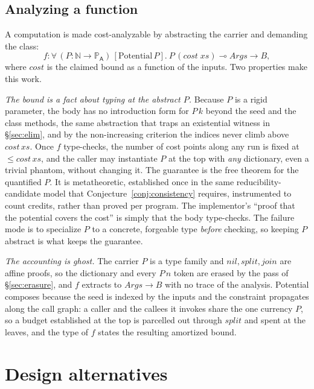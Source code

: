 \documentclass[11pt]{article}
\newcommand{\Prop}[1]{\mathbb{P}_{#1}}            %
\theoremstyle{definition}
\theoremstyle{plain}
\begin{document}
\subsection{Analyzing a function}

A computation is made cost-analyzable by abstracting the carrier and demanding the
class:
\[
  f : \forall\,(P:\mathbb{N}\to\Prop{\mathsf{A}})\,[\mathrm{Potential}\,P].\
  P\,(\mathit{cost}\;\mathit{xs}) \multimap \mathit{Args} \to B,
\]
where $\mathit{cost}$ is the claimed bound as a function of the inputs. Two
properties make this work.

\emph{The bound is a fact about typing at the abstract $P$.} Because $P$ is a rigid
parameter, the body has no introduction form for $P\,k$ beyond the seed and the
class methods, the same abstraction that traps an existential witness in
\S\ref{sec:elim}, and by the non-increasing criterion the indices never climb above
$\mathit{cost}\,\mathit{xs}$. Once $f$ type-checks, the number of cost points along
any run is fixed at $\le \mathit{cost}\,\mathit{xs}$, and the caller may instantiate
$P$ at the top with \emph{any} dictionary, even a trivial phantom, without changing
it. The guarantee is the free theorem for the quantified $P$. It is metatheoretic,
established once in the same reducibility-candidate model that
Conjecture~\ref{conj:consistency} requires, instrumented to count credits, rather
than proved per program. The implementor's ``proof that the potential covers the
cost'' is simply that the body type-checks. The failure mode is to specialize $P$
to a concrete, forgeable type \emph{before} checking, so keeping $P$ abstract is
what keeps the guarantee.

\emph{The accounting is ghost.} The carrier $P$ is a type family and
$\mathit{nil},\mathit{split},\mathit{join}$ are affine proofs, so the dictionary
and every $P\,n$ token are erased by the pass of \S\ref{sec:erasure}, and $f$
extracts to $\mathit{Args}\to B$ with no trace of the analysis. Potential composes
because the seed is indexed by the inputs and the constraint propagates along the
call graph: a caller and the callees it invokes share the one currency $P$, so a
budget established at the top is parcelled out through $\mathit{split}$ and spent at
the leaves, and the type of $f$ states the resulting amortized bound.

\section{Design alternatives}\label{sec:alts}
\end{document}
